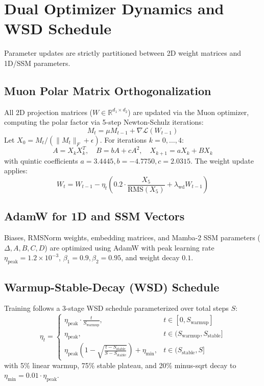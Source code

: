 \documentclass[10pt,twocolumn,letterpaper]{article}
\begin{document}
\section{Dual Optimizer Dynamics and WSD Schedule}

Parameter updates are strictly partitioned between 2D weight matrices and 1D/SSM parameters.

\subsection{Muon Polar Matrix Orthogonalization}
All 2D projection matrices ($W \in \mathbb{R}^{d_1 \times d_2}$) are updated via the Muon optimizer, computing the polar factor via 5-step Newton-Schulz iterations:
\begin{equation}
    M_t = \mu M_{t-1} + \nabla \mathcal{L}(W_{t-1})
\end{equation}
Let $X_0 = M_t / (\|M_t\|_F + \epsilon)$. For iterations $k = 0, \dots, 4$:
\begin{equation}
    A = X_k X_k^T, \quad B = b A + c A^2, \quad X_{k+1} = a X_k + B X_k
\end{equation}
with quintic coefficients $a = 3.4445, b = -4.7750, c = 2.0315$. The weight update applies:
\begin{equation}
    W_t = W_{t-1} - \eta_t \left( 0.2 \cdot \frac{X_5}{\text{RMS}(X_5)} + \lambda_{\text{wd}} W_{t-1} \right)
\end{equation}

\subsection{AdamW for 1D and SSM Vectors}
Biases, RMSNorm weights, embedding matrices, and Mamba-2 SSM parameters ($\Delta, A, B, C, D$) are optimized using AdamW with peak learning rate $\eta_{\text{peak}} = 1.2 \times 10^{-3}$, $\beta_1 = 0.9, \beta_2 = 0.95$, and weight decay $0.1$.

\subsection{Warmup-Stable-Decay (WSD) Schedule}
Training follows a 3-stage WSD schedule parameterized over total steps $S$:
\begin{equation}
    \eta_t = \begin{cases}
        \eta_{\text{peak}} \cdot \frac{t}{S_{\text{warmup}}}, & t \in [0, S_{\text{warmup}}] \\
        \eta_{\text{peak}}, & t \in (S_{\text{warmup}}, S_{\text{stable}}] \\
        \eta_{\text{peak}} \left( 1 - \sqrt{\frac{t - S_{\text{stable}}}{S - S_{\text{stable}}}} \right) + \eta_{\text{min}}, & t \in (S_{\text{stable}}, S]
    \end{cases}
\end{equation}
with 5\% linear warmup, 75\% stable plateau, and 20\% minus-sqrt decay to $\eta_{\text{min}} = 0.01 \cdot \eta_{\text{peak}}$.
\end{document}
